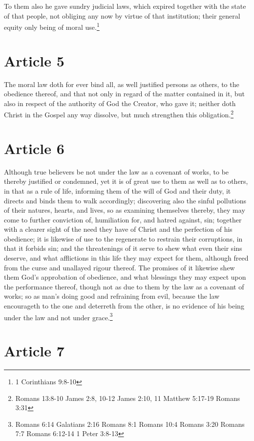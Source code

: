 \documentclass[12pt,letterpaper]{book}
\begin{document}
To them also he gave sundry judicial laws, which expired together with the state of that people, not obliging any now by virtue of that institution; their general equity only being of moral use.\footnote{1 Corinthians 9:8-10}

\section{Article 5}

The moral law doth for ever bind all, as well justified persons as others, to the obedience thereof, and that not only in regard of the matter contained in it, but also in respect of the authority of God the Creator, who gave it; neither doth Christ in the Gospel any way dissolve, but much strengthen this obligation.\footnote{Romans 13:8-10 James 2:8, 10-12 James 2:10, 11 Matthew 5:17-19 Romans 3:31}

\section{Article 6}

Although true believers be not under the law as a covenant of works, to be thereby justified or condemned, yet it is of great use to them as well as to others, in that as a rule of life, informing them of the will of God and their duty, it directs and binds them to walk accordingly; discovering also the sinful pollutions of their natures, hearts, and lives, so as examining themselves thereby, they may come to further conviction of, humiliation for, and hatred against, sin; together with a clearer sight of the need they have of Christ and the perfection of his obedience; it is likewise of use to the regenerate to restrain their corruptions, in that it forbids sin; and the threatenings of it serve to shew what even their sins deserve, and what afflictions in this life they may expect for them, although freed from the curse and unallayed rigour thereof. The promises of it likewise shew them God's approbation of obedience, and what blessings they may expect upon the performance thereof, though not as due to them by the law as a covenant of works; so as man's doing good and refraining from evil, because the law encourageth to the one and deterreth from the other, is no evidence of his being under the law and not under grace.\footnote{Romans 6:14 Galatians 2:16 Romans 8:1 Romans 10:4 Romans 3:20 Romans 7:7 Romans 6:12-14 1 Peter 3:8-13}

\section{Article 7}
\end{document}
